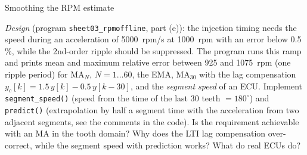 \begin{exercise}{Smoothing the RPM estimate}{\Wokwi}
\begin{tasks}
  \item \emph{Design} (program \texttt{sheet03\_rpmoffline}, part (e)): the
    injection timing needs the speed during an acceleration of
    \SI{5000}{rpm/s} at \SI{1000}{rpm} with an error below 0.5\,\%, while the
    2nd-order ripple should be suppressed. The program runs this ramp and
    prints mean and maximum relative error between 925 and \SI{1075}{rpm}
    (one ripple period) for MA$_N$, $N=1\dots60$, the EMA, MA$_{30}$ with the
    lag compensation $y_c[k]=1.5\,y[k]-0.5\,y[k-30]$, and the \emph{segment
    speed} of an ECU. Implement \texttt{segment\_speed()} (speed from the time
    of the last 30 teeth $=180^\circ$) and \texttt{predict()} (extrapolation by
    half a segment time with the acceleration from two adjacent segments, see
    the comments in the code). Is the requirement achievable with an MA in the
    tooth domain? Why does the LTI lag compensation over-correct, while the
    segment speed with prediction works? What do real ECUs do?
\end{tasks}
\end{exercise}

